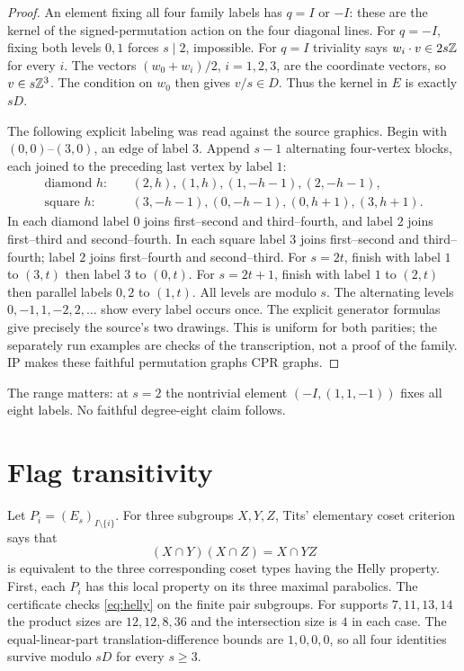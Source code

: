 \begin{proof}
An element fixing all four family labels has $q=I$ or $-I$: these are
the kernel of the signed-permutation action on the four diagonal lines.
For $q=-I$, fixing both levels $0,1$ forces $s\mid2$, impossible.
For $q=I$ triviality says $w_i\cdot v\in2s\mathbb Z$ for every $i$.
The vectors $(w_0+w_i)/2$, $i=1,2,3$, are the coordinate vectors,
so $v\in s\mathbb Z^3$. The condition on $w_0$ then gives $v/s\in D$.
Thus the kernel in $E$ is exactly $sD$.

The following explicit labeling was read against the source graphics.
Begin with $(0,0)$--$(3,0)$, an edge of label $3$. Append $s-1$ alternating
four-vertex blocks, each joined to the preceding last vertex by label $1$:
\begin{align*}
\text{diamond }h:&\quad(2,h),(1,h),(1,-h-1),(2,-h-1),\\
\text{square }h:&\quad(3,-h-1),(0,-h-1),(0,h+1),(3,h+1).
\end{align*}
In each diamond label $0$ joins first--second and third--fourth, and
label $2$ joins first--third and second--fourth. In each square label $3$
joins first--second and third--fourth; label $2$ joins first--fourth and
second--third. For $s=2t$, finish with label $1$ to $(3,t)$ then label $3$
to $(0,t)$. For $s=2t+1$, finish with label $1$ to $(2,t)$ then parallel
labels $0,2$ to $(1,t)$. All levels are modulo $s$.
The alternating levels $0,-1,1,-2,2,\ldots$ show every label occurs once.
The explicit generator formulas give precisely the source's two drawings.
This is uniform for both parities; the separately run examples are
checks of the transcription, not a proof of the family. IP makes these
faithful permutation graphs CPR graphs.
\end{proof}
The range matters: at $s=2$ the nontrivial element $(-I,(1,1,-1))$
fixes all eight labels. No faithful degree-eight claim follows.

\section{Flag transitivity}
Let $P_i=(E_s)_{I\setminus\{i\}}$. For three subgroups $X,Y,Z$, Tits'
elementary coset criterion says that
\begin{equation}\label{eq:helly}
(X\cap Y)(X\cap Z)=X\cap YZ
\end{equation}
is equivalent to the three corresponding coset types having the Helly
property. First, each $P_i$ has this local property on its three maximal
parabolics. The certificate checks \eqref{eq:helly} on the finite pair
subgroups. For supports $7,11,13,14$ the product sizes are $12,12,8,36$
and the intersection size is $4$ in each case. The equal-linear-part
translation-difference bounds are $1,0,0,0$, so all four identities
survive modulo $sD$ for every $s\ge3$.

